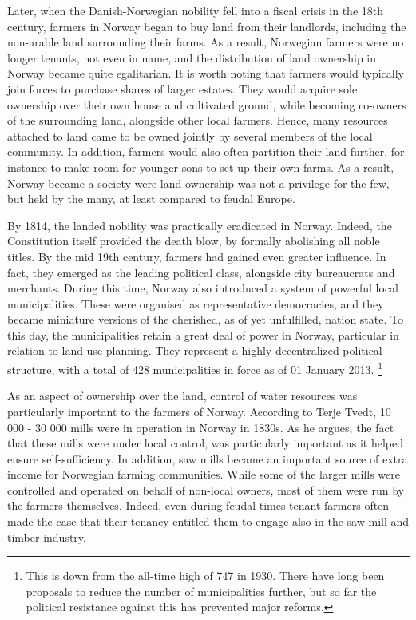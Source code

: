 Later, when the Danish-Norwegian nobility fell into a fiscal crisis in the 18th century, farmers in Norway began to buy land from their landlords, including the non-arable land surrounding their farms. As a result, Norwegian farmers were no longer tenants, not even in name, and the distribution of land ownership in Norway became quite egalitarian. It is worth noting that farmers would typically join forces to purchase shares of larger estates. They would acquire sole ownership over their own house and cultivated ground, while becoming co-owners of the surrounding land, alongside other local farmers. Hence, many resources attached to land came to be owned jointly by several members of the local community. In addition, farmers would also often partition their land further, for instance to make room for younger sons to set up their own farms. As a result, Norway became a society were land ownership was not a privilege for the few, but held by the many, at least compared to feudal Europe.

By 1814, the landed nobility was practically eradicated in Norway. Indeed, the Constitution itself provided the death blow, by formally abolishing all noble titles. By the mid 19th century, farmers had gained even greater influence. In fact, they emerged as the leading political class, alongside city bureaucrats and merchants. During this time, Norway also introduced a system of powerful local municipalities. These were organised as representative democracies, and they became miniature versions of the cherished, as of yet unfulfilled, nation state. To this day, the municipalities retain a great deal of power in Norway, particular in relation to land use planning. They represent a highly decentralized political structure, with a total of 428 municipalities in force as of 01 January 2013. \footnote{This is down from the all-time high of 747 in 1930. There have long been proposals to reduce the number of municipalities further, but so far the political resistance against this has prevented major reforms.}

As an aspect of ownership over the land, control of water resources was particularly important to the farmers of Norway. According to Terje Tvedt, 10 000 - 30 000 mills were in operation in Norway in 1830s. As he argues, the fact that these mills were under local control, was particularly important as it helped ensure self-sufficiency. In addition, saw mills became an important source of extra income for Norwegian farming communities. While some of the larger mills were controlled and operated on behalf of non-local owners, most of them were run by the farmers themselves. Indeed, even during feudal times tenant farmers often made the case that their tenancy entitled them to engage also in the saw mill and timber industry.

